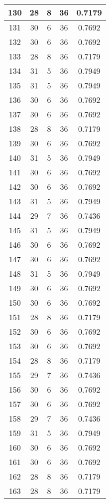 \documentclass[letterpaper, 12pt]{article}
\begin{document}
\begin{longtable}{|c|c|c|c|c|}
\hline
130 & 28 & 8 & 36 & 0.7179 \\
\hline
131 & 30 & 6 & 36 & 0.7692 \\
\hline
132 & 30 & 6 & 36 & 0.7692 \\
\hline
133 & 28 & 8 & 36 & 0.7179 \\
\hline
134 & 31 & 5 & 36 & 0.7949 \\
\hline
135 & 31 & 5 & 36 & 0.7949 \\
\hline
136 & 30 & 6 & 36 & 0.7692 \\
\hline
137 & 30 & 6 & 36 & 0.7692 \\
\hline
138 & 28 & 8 & 36 & 0.7179 \\
\hline
139 & 30 & 6 & 36 & 0.7692 \\
\hline
140 & 31 & 5 & 36 & 0.7949 \\
\hline
141 & 30 & 6 & 36 & 0.7692 \\
\hline
142 & 30 & 6 & 36 & 0.7692 \\
\hline
143 & 31 & 5 & 36 & 0.7949 \\
\hline
144 & 29 & 7 & 36 & 0.7436 \\
\hline
145 & 31 & 5 & 36 & 0.7949 \\
\hline
146 & 30 & 6 & 36 & 0.7692 \\
\hline
147 & 30 & 6 & 36 & 0.7692 \\
\hline
148 & 31 & 5 & 36 & 0.7949 \\
\hline
149 & 30 & 6 & 36 & 0.7692 \\
\hline
150 & 30 & 6 & 36 & 0.7692 \\
\hline
151 & 28 & 8 & 36 & 0.7179 \\
\hline
152 & 30 & 6 & 36 & 0.7692 \\
\hline
153 & 30 & 6 & 36 & 0.7692 \\
\hline
154 & 28 & 8 & 36 & 0.7179 \\
\hline
155 & 29 & 7 & 36 & 0.7436 \\
\hline
156 & 30 & 6 & 36 & 0.7692 \\
\hline
157 & 30 & 6 & 36 & 0.7692 \\
\hline
158 & 29 & 7 & 36 & 0.7436 \\
\hline
159 & 31 & 5 & 36 & 0.7949 \\
\hline
160 & 30 & 6 & 36 & 0.7692 \\
\hline
161 & 30 & 6 & 36 & 0.7692 \\
\hline
162 & 28 & 8 & 36 & 0.7179 \\
\hline
163 & 28 & 8 & 36 & 0.7179 \\

\end{longtable}
\end{document}
